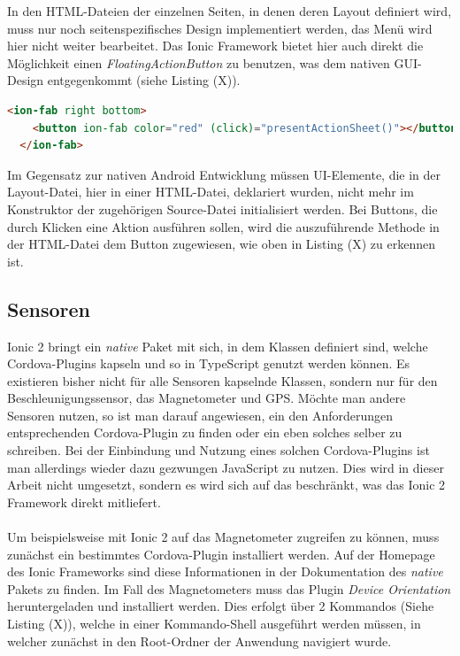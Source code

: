 In den HTML-Dateien der einzelnen Seiten, in denen deren Layout definiert wird, muss nur noch seitenspezifisches Design implementiert werden, das Menü wird hier nicht weiter bearbeitet. Das Ionic Framework bietet hier auch direkt die Möglichkeit einen \textit{FloatingActionButton} zu benutzen, was dem nativen GUI-Design entgegenkommt (siehe Listing (X)).

\begin{lstlisting}[caption=Deklaration eines \textit{FloatingActionButton}, label=lst:FloatingActionButtonIonic, language=html]
<ion-fab right bottom>
    <button ion-fab color="red" (click)="presentActionSheet()"></button>
  </ion-fab>
\end{lstlisting}

Im Gegensatz zur nativen Android Entwicklung müssen UI-Elemente, die in der Layout-Datei, hier in einer HTML-Datei, deklariert wurden, nicht mehr im Konstruktor der zugehörigen Source-Datei initialisiert werden. Bei Buttons, die durch Klicken eine Aktion ausführen sollen, wird die auszuführende Methode in der HTML-Datei dem Button zugewiesen, wie oben in Listing (X) zu erkennen ist. 

\subsection*{Sensoren}

Ionic 2 bringt ein \textit{native} Paket mit sich, in dem Klassen definiert sind, welche Cordova-Plugins kapseln und so in TypeScript genutzt werden können. Es existieren bisher nicht für alle Sensoren kapselnde Klassen, sondern nur für den Beschleunigungssensor, das Magnetometer und GPS. Möchte man andere Sensoren nutzen, so ist man darauf angewiesen, ein den Anforderungen entsprechenden Cordova-Plugin zu finden oder ein eben solches selber zu schreiben. Bei der Einbindung und Nutzung eines solchen Cordova-Plugins ist man allerdings wieder dazu gezwungen JavaScript zu nutzen. Dies wird in dieser Arbeit nicht umgesetzt, sondern es wird sich auf das beschränkt, was das Ionic 2 Framework direkt mitliefert.
\\
\\
Um beispielsweise mit Ionic 2 auf das Magnetometer zugreifen zu können, muss zunächst ein bestimmtes Cordova-Plugin installiert werden. Auf der Homepage des Ionic Frameworks sind diese Informationen in der Dokumentation des \textit{native} Pakets zu finden. Im Fall des Magnetometers muss das Plugin \textit{Device Orientation} heruntergeladen und installiert werden. Dies erfolgt über 2 Kommandos (Siehe Listing (X)), welche in einer Kommando-Shell ausgeführt werden müssen, in welcher zunächst in den Root-Ordner der Anwendung navigiert wurde. 

